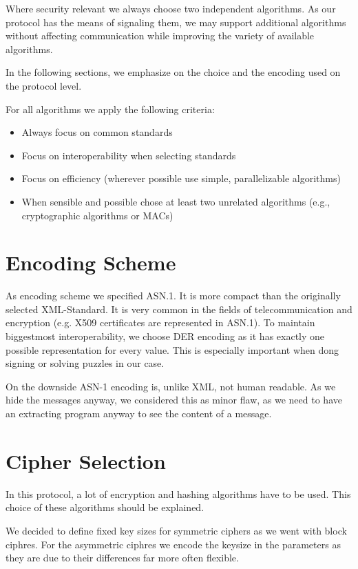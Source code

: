 Where security relevant we always choose two independent algorithms. As our protocol has the means of signaling them, we may support additional algorithms without affecting communication while improving the variety of available algorithms.

In the following sections, we emphasize on the choice and the encoding used on the protocol level.

For all algorithms we apply the following criteria:
\begin{itemize}
	\item Always focus on common standards
	\item Focus on interoperability when selecting standards
	\item Focus on efficiency (wherever possible use simple, parallelizable algorithms)
	\item When sensible and possible chose at least two unrelated algorithms (e.g., cryptographic algorithms or MACs)
\end{itemize}


\section{Encoding Scheme}
As encoding scheme we specified ASN.1\cite{dis19878824}. It is more compact than the originally selected XML-Standard. It is very common in the fields of telecommunication and encryption (e.g. X509 certificates are represented in ASN.1). To maintain biggestmost interoperability, we choose DER encoding as it has exactly one possible representation for every value. This is especially important when dong signing or solving puzzles in our case.

On the downside ASN-1 encoding is, unlike XML, not human readable. As we hide the messages anyway, we considered this as minor flaw, as we need to have an extracting program anyway to see the content of a message.

\section{Cipher Selection}
In this protocol, a lot of encryption and hashing algorithms have to be used. This choice of these algorithms should be explained. 

We decided to define fixed key sizes for symmetric ciphers as we went with block ciphres. For the asymmetric ciphres we encode the keysize in the parameters as they are due to their differences far more often flexible.

